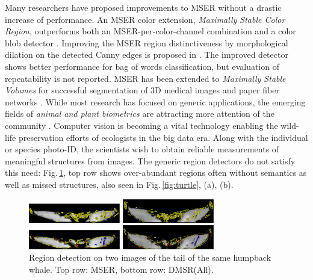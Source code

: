 \documentclass{article}
\begin{document}
Many researchers have proposed improvements to MSER without a drastic increase of performance. An MSER color extension, {\em Maximally Stable Color Region}, outperforms both an MSER-per-color-channel combination and a color blob detector \cite{Forssen07}. Improving the MSER region distinctiveness by morphological dilation on the detected Canny edges is proposed in \cite{Wang14}. The improved detector shows better performance for bag of words classification, but evaluation of repeatability is not reported. MSER has been extended to {\em Maximally Stable Volumes} for successful segmentation of 3D medical images and paper fiber networks \cite{DonoserB06}.
While most research has focused on generic applications, the emerging fields of {\em animal and plant biometrics} are attracting more attention of the community \cite{Kuehl2013, leafsnap_eccv2012}. Computer vision is becoming a vital technology enabling the wild-life preservation efforts of ecologists in the big data era. Along with the individual or species photo-ID, the scientists wish to obtain reliable measurements of meaningful structures from images. The generic region detectors do not satisfy this need: Fig.\,\ref{fig:tails}, top row shows over-abundant regions often without semantics as well as missed structures, also seen in Fig.\,\ref{fig:turtle}, (a), (b). 

\begin{figure}[htb]

\begin{minipage}[b]{.48\linewidth}
  \centering
  \centerline{\includegraphics[width=4cm]{./Figs/mserTailA}}
\end{minipage}
\begin{minipage}[b]{0.51\linewidth}
  \centering
  \centerline{\includegraphics[width=4cm]{./Figs/mserTailB}}
\end{minipage}
\hfill
\begin{minipage}[b]{.48\linewidth}
  \centering
  \centerline{\includegraphics[width=4cm]{./Figs/dmsrTailA}}
\end{minipage}
\begin{minipage}[b]{0.51\linewidth}
  \centering
  \centerline{\includegraphics[width=4cm]{./Figs/dmsrTailB}}
\end{minipage}
\hfill
\vspace{-0.4cm}
\caption{Region detection on two images of the tail of the same humpback whale. 
Top row: MSER, bottom row: DMSR(All).}
\label{fig:tails}
\vspace{-0.3cm}
\end{figure}
\end{document}
